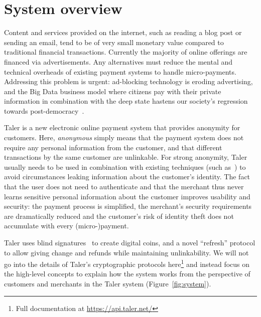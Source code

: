 \documentclass[twoside,letterpaper]{sigalternate}
\begin{document}
\maketitle

\section{System overview}

Content and services provided on the internet, such as reading a blog post or
sending an email, tend to be of very small monetary value compared to
traditional financial transactions.  Currently the majority of online offerings
are financed via advertisements.  Any alternatives must reduce the mental
and technical overheads of existing payment systems to handle micro-payments.
Addressing this problem is urgent: ad-blocking technology is eroding
advertising, and the Big Data business model where citizens pay with their
private information in combination with the deep state hastens our society's
regression towards post-democracy~\cite{rms2013democracy}.

Taler is a new electronic online payment system that provides
anonymity for customers.  Here, {\em anonymous} simply means that the
payment system does not require any personal information from the
customer, and that different transactions by the same customer are
unlinkable.  For strong anonymity, Taler usually needs to be used in
combination with existing techniques (such as~\cite{apod}) to avoid
circumstances leaking information about the customer's identity.  The
fact that the user does not need to authenticate and that the merchant
thus never learns sensitive personal information about the customer
improves usability and security: the payment process is simplified, the
merchant's security requirements are dramatically reduced and the customer's
risk of identity theft does not accumulate with every (micro-)payment.

Taler uses blind signatures~\cite{chaum1983blind} to create digital
coins, and a novel ``refresh'' protocol to allow giving change and
refunds while maintaining unlinkability.  We will not go into the
details of Taler's cryptographic protocols here\footnote{Full
documentation at \url{https://api.taler.net/}} and instead focus on the
high-level concepts to explain how the system works from the
perspective of customers and merchants in the Taler
system (Figure~\ref{fig:system}).
\end{document}
